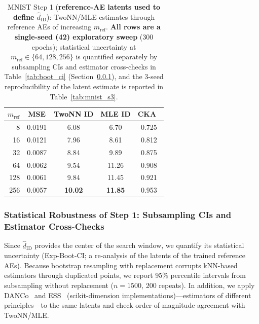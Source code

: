 \documentclass[make,article,submit,pdftex,moreauthors]{Definitions/mdpi}
\newcommand{\hatdID}{\hat{d}_{\mathrm{ID}}}
\begin{document}
\begin{table}[H]
\caption{MNIST Step 1 (\textbf{reference-AE latents used to define
$\hatdID$}): TwoNN/MLE estimates through reference AEs of
increasing $m_{\mathrm{ref}}$. \textbf{All rows are a single-seed (42)
exploratory sweep} (300 epochs); statistical uncertainty at
$m_{\mathrm{ref}} \in \{64, 128, 256\}$ is quantified separately by
subsampling CIs and estimator cross-checks in Table~\ref{tab:boot_ci}
(Section~\ref{sec:exp_mnist_ci}), and the 3-seed reproducibility of the
latent estimate is reported in Table~\ref{tab:mnist_s3}.}
\label{tab:mnist_s1}
\small
\begin{tabular}{rcccc}
\toprule
$m_{\mathrm{ref}}$ & \textbf{MSE} & \textbf{TwoNN ID} & \textbf{MLE ID} & \textbf{CKA}~\cite{kornblith2019cka} \\
\midrule
8   & 0.0191 & 6.08 & 6.70 & 0.725 \\
16  & 0.0121 & 7.96 & 8.61 & 0.812 \\
32  & 0.0087 & 8.84 & 9.89 & 0.875 \\
64  & 0.0062 & 9.54 & 11.26 & 0.908 \\
128 & 0.0061 & 9.84 & 11.45 & 0.921 \\
256 & 0.0057 & \textbf{10.02} & \textbf{11.85} & 0.953 \\
\bottomrule
\end{tabular}
\end{table}

\subsubsection{Statistical Robustness of Step 1: Subsampling CIs and Estimator Cross-Checks}
\label{sec:exp_mnist_ci}

Since $\hatdID$ provides the center of the search window, we quantify its
statistical uncertainty (Exp-Boot-CI; a re-analysis of the latents of the
trained reference AEs).
Because bootstrap resampling with replacement corrupts kNN-based estimators
through duplicated points, we report 95\% percentile intervals from
subsampling without replacement ($n = 1500$, 200 repeats).
In addition, we apply DANCo~\cite{ceruti2014danco} and
ESS~\cite{johnsson2015ess} (scikit-dimension implementations)---estimators
of different principles---to the same latents and check order-of-magnitude
agreement with TwoNN/MLE.
\end{document}
